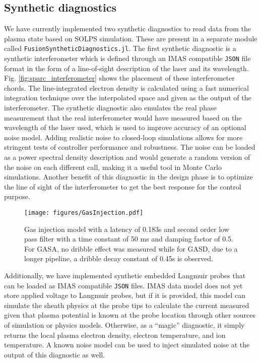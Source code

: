 \subsection{Synthetic diagnostics}
We have currently implemented two synthetic diagnostics to read data from the plasma state based on SOLPS simulation. These are present in a separate module called \texttt{FusionSyntheticDiagnostics.jl}. The first synthetic diagnostic is a synthetic interferometer which is defined through an IMAS compatible \texttt{JSON} file format in the form of a line-of-sight description of the laser and its wavelength. Fig. \ref{fig:sparc_interferometer} shows the placement of these interferometer chords. The line-integrated electron density is calculated using a fast numerical integration technique over the interpolated space and given as the output of the interferometer. The synthetic diagnostic also emulates the real phase measurement that the real interferometer would have measured based on the wavelength of the laser used, which is used to improve accuracy of an optional noise model. Adding realistic noise to closed-loop simulations allows for more stringent tests of controller performance and robustness. The noise can be loaded as a power spectral density description and would generate a random version of the noise on each different call, making it a useful tool in Monte Carlo simulations. Another benefit of this diagnostic in the design phase is to optimize the line of sight of the interferometer to get the best response for the control purpose.

\begin{figure}[!h]
 \centering
 \texttt{[image: figures/GasInjection.pdf]}
 \caption{Gas injection model with a latency of 0.183s and second order low pass filter with a time constant of 50 ms and damping factor of 0.5. For GASA, no dribble effect was measured while for GASD, due to a longer pipeline, a dribble decay constant of 0.45s is observed.}
 \label{fig:gas_injection}
\end{figure} 

Additionally, we have implemented synthetic embedded Langmuir probes that can be loaded as IMAS compatible \texttt{JSON} files. IMAS data model does not yet store applied voltage to Langmuir probes, but if it is provided, this model can simulate the sheath physics\cite{Conde2011, stangeby2000plasma} at the probe tips to calculate the current measured given that plasma potential is known at the probe location through other sources of simulation or physics models.
Otherwise, as a ``magic'' diagnostic, it simply returns the local plasma electron density, electron temperature, and ion temperature. A known noise model can be used to inject simulated noise at the output of this diagnostic as well.

